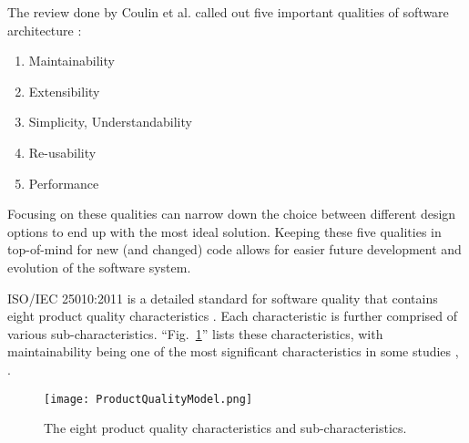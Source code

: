 The review done by Coulin et al. called out five important qualities of software architecture \cite{coulin:2019}:

\vspace{0.25cm}
\begin{enumerate}
    \item Maintainability
    \item Extensibility
    \item Simplicity, Understandability
    \item Re-usability
    \item Performance
\end{enumerate}
\vspace{0.25cm}

Focusing on these qualities can narrow down the choice between different design options to end up with the most ideal solution. Keeping these five qualities in top-of-mind for new (and changed) code allows for easier future development and evolution of the software system.

ISO/IEC 25010:2011 is a detailed standard for software quality that contains eight product quality characteristics  \cite{iso/iec:25010:2011}. Each characteristic is further comprised of various sub-characteristics. ``Fig.~\ref{figProductQualityModel}'' lists these characteristics, with maintainability being one of the most significant characteristics in some studies \cite{gupta:2021}, \cite{adewumi:2016}.

\begin{figure}[ht]
  \centerline{
    \texttt{[image: ProductQualityModel.png]}
  }
  \caption{The eight product quality characteristics and sub-characteristics.}
  \label{figProductQualityModel}
\end{figure}
